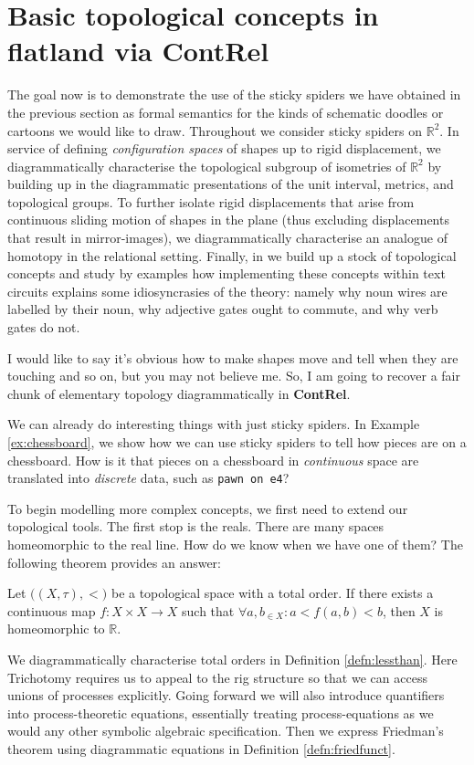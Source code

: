 \section{Basic topological concepts in flatland via \textbf{ContRel}}\label{sec:concepts}

The goal now is to demonstrate the use of the sticky spiders we have obtained in the previous section as formal semantics for the kinds of schematic doodles or cartoons we would like to draw. Throughout we consider sticky spiders on $\mathbb{R}^2$. In service of defining \emph{configuration spaces} of shapes up to rigid displacement, we diagrammatically characterise the topological subgroup of isometries of $\mathbb{R}^2$ by building up in the diagrammatic presentations of the unit interval, metrics, and topological groups. To further isolate rigid displacements that arise from continuous sliding motion of shapes in the plane (thus excluding displacements that result in mirror-images), we diagrammatically characterise an analogue of homotopy in the relational setting. Finally, in we build up a stock of topological concepts and study by examples how implementing these concepts within text circuits explains some idiosyncrasies of the theory: namely why noun wires are labelled by their noun, why adjective gates ought to commute, and why verb gates do not.

 I would like to say it's obvious how to make shapes move and tell when they are touching and so on, but you may not believe me. So, I am going to recover a fair chunk of elementary topology diagrammatically in \textbf{ContRel}.

 We can already do interesting things with just sticky spiders. In Example \ref{ex:chessboard}, we show how we can use sticky spiders to tell how pieces are on a chessboard. How is it that pieces on a chessboard in \emph{continuous} space are translated into \emph{discrete} data, such as \texttt{pawn on e4}?

To begin modelling more complex concepts, we first need to extend our topological tools. The first stop is the reals. There are many spaces homeomorphic to the real line. How do we know when we have one of them? The following theorem provides an answer:
\begin{theorem}[Friedman]\label{thm:Friedman}
Let $\big((X,\tau), < \big)$ be a topological space with a total order. If there exists a continuous map $f: X \times X \rightarrow X$ such that $\forall a,b_{\in X} : a < f(a,b) < b$, then $X$ is homeomorphic to $\mathbb{R}$. \citep{friedman_fom_2005}
\end{theorem}
We diagrammatically characterise total orders in Definition \ref{defn:lessthan}. Here Trichotomy requires us to appeal to the rig structure so that we can access unions of processes explicitly. Going forward we will also introduce quantifiers into process-theoretic equations, essentially treating process-equations as we would any other symbolic algebraic specification. Then we express Friedman's theorem using diagrammatic equations in Definition \ref{defn:friedfunct}.

